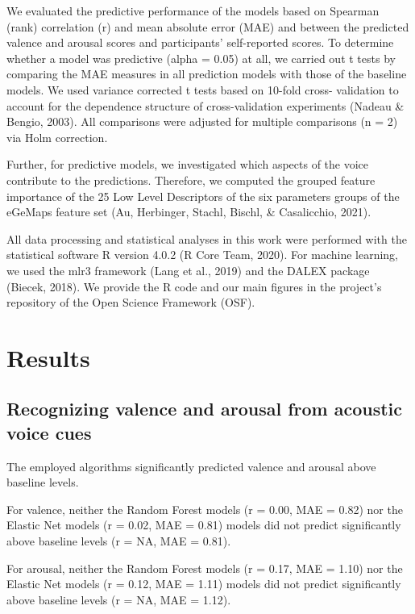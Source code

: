 \documentclass[
  english,
  man,floatsintext]{apa6}
\begin{document}
We evaluated the predictive performance of the models based on Spearman (rank) correlation (r) and mean absolute error (MAE) and between the predicted valence and arousal scores and participants' self-reported scores. To determine whether a model was predictive (alpha = 0.05) at all, we carried out t tests by comparing the MAE measures in all prediction models with those of the baseline models. We used variance corrected t tests based on 10-fold cross- validation to account for the dependence structure of cross-validation experiments (Nadeau \& Bengio, 2003). All comparisons were adjusted for multiple comparisons (n = 2) via Holm correction.

Further, for predictive models, we investigated which aspects of the voice contribute to the predictions. Therefore, we computed the grouped feature importance of the 25 Low Level Descriptors of the six parameters groups of the eGeMaps feature set (Au, Herbinger, Stachl, Bischl, \& Casalicchio, 2021).

All data processing and statistical analyses in this work were performed with the statistical software R version 4.0.2 (R Core Team, 2020). For machine learning, we used the mlr3 framework (Lang et al., 2019) and the DALEX package (Biecek, 2018). We provide the R code and our main figures in the project's repository of the Open Science Framework (OSF).

\hypertarget{results}{%
\section{Results}\label{results}}

\hypertarget{recognizing-valence-and-arousal-from-acoustic-voice-cues}{%
\subsection{Recognizing valence and arousal from acoustic voice cues}\label{recognizing-valence-and-arousal-from-acoustic-voice-cues}}

The employed algorithms significantly predicted valence and arousal above baseline levels.

For valence, neither the Random Forest models (r = 0.00, MAE = 0.82) nor the Elastic Net models (r = 0.02, MAE = 0.81) models did not predict significantly above baseline levels (r = NA, MAE = 0.81).

For arousal, neither the Random Forest models (r = 0.17, MAE = 1.10) nor the Elastic Net models (r = 0.12, MAE = 1.11) models did not predict significantly above baseline levels (r = NA, MAE = 1.12).
\end{document}
